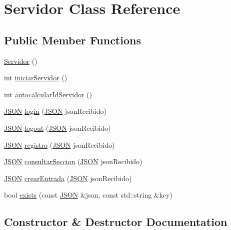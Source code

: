 \hypertarget{classServidor}{}\section{Servidor Class Reference}
\label{classServidor}
\subsection*{Public Member Functions}
\begin{DoxyCompactItemize}
\item 
\mbox{\hyperlink{classServidor_a6be6f59fd470098d8d79bfa22c378b81}{Servidor}} ()
\item 
int \mbox{\hyperlink{classServidor_a2a7fdca08064f9e567c579a2cb34f267}{iniciar\+Servidor}} ()
\item 
int \mbox{\hyperlink{classServidor_a292f87f595ed2afd654abe3cc5ba8dc0}{autocalcular\+Id\+Servidor}} ()
\item 
\mbox{\hyperlink{classnlohmann_1_1basic__json}{J\+S\+ON}} \mbox{\hyperlink{classServidor_afa99d1a7d42e43c66c066aa8d4622fbf}{login}} (\mbox{\hyperlink{classnlohmann_1_1basic__json}{J\+S\+ON}} json\+Recibido)
\item 
\mbox{\hyperlink{classnlohmann_1_1basic__json}{J\+S\+ON}} \mbox{\hyperlink{classServidor_a612baa3e7a827632a48aacdc024e2a20}{logout}} (\mbox{\hyperlink{classnlohmann_1_1basic__json}{J\+S\+ON}} json\+Recibido)
\item 
\mbox{\hyperlink{classnlohmann_1_1basic__json}{J\+S\+ON}} \mbox{\hyperlink{classServidor_adc19f6be9f624330db206a9d98c981a5}{registro}} (\mbox{\hyperlink{classnlohmann_1_1basic__json}{J\+S\+ON}} json\+Recibido)
\item 
\mbox{\hyperlink{classnlohmann_1_1basic__json}{J\+S\+ON}} \mbox{\hyperlink{classServidor_a172605658340719264d589037d2417d8}{consultar\+Seccion}} (\mbox{\hyperlink{classnlohmann_1_1basic__json}{J\+S\+ON}} json\+Recibido)
\item 
\mbox{\hyperlink{classnlohmann_1_1basic__json}{J\+S\+ON}} \mbox{\hyperlink{classServidor_a211b7b43cd2b5d81b1f21413bce9fbf2}{crear\+Entrada}} (\mbox{\hyperlink{classnlohmann_1_1basic__json}{J\+S\+ON}} json\+Recibido)
\item 
bool \mbox{\hyperlink{classServidor_a41f9f66959c43b27d1d13cf4f20eca55}{exists}} (const \mbox{\hyperlink{classnlohmann_1_1basic__json}{J\+S\+ON}} \&json, const std\+::string \&key)
\end{DoxyCompactItemize}


\subsection{Constructor \& Destructor Documentation}
\mbox{\label{classServidor_a6be6f59fd470098d8d79bfa22c378b81}} 

